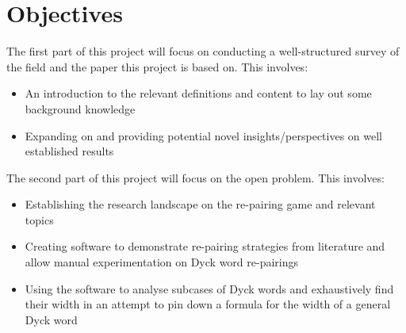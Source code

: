 \documentclass[a4paper]{article}
\begin{document}
\section{Objectives}
The first part of this project will focus on conducting a well-structured survey of the field and the paper this project is based on. This involves:
\begin{itemize}
	\item An introduction to the relevant definitions and content to lay out some background knowledge
	\item Expanding on and providing potential novel insights/perspectives on well established results
\end{itemize}
The second part of this project will focus on the open problem. This involves:
\begin{itemize}
	\item Establishing the research landscape on the re-pairing game and relevant topics
	\item Creating software to demonstrate re-pairing strategies from literature and allow manual experimentation on Dyck word re-pairings
	\item Using the software to analyse subcases of Dyck words and exhaustively find their width in an attempt to pin down a formula for the width of a general Dyck word
\end{itemize}
\end{document}
